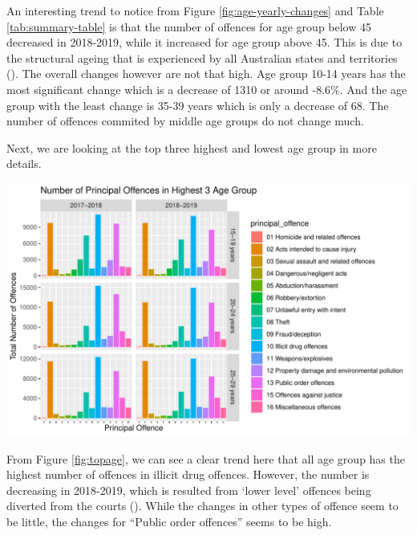 \documentclass[11pt,a4paper,]{article}
\let\origfigure\figure
\let\endorigfigure\endfigure
\renewenvironment{figure}[1][2] {
\expandafter\origfigure\expandafter[H]
} {
\endorigfigure
}
\begin{document}
An interesting trend to notice from Figure \ref{fig:age-yearly-changes} and Table \ref{tab:summary-table} is that the number of offences for age group below 45 decreased in 2018-2019, while it increased for age group above 45. This is due to the structural ageing that is experienced by all Australian states and territories (\textcite{AIC}). The overall changes however are not that high. Age group 10-14 years has the most significant change which is a decrease of 1310 or around -8.6\%. And the age group with the least change is 35-39 years which is only a decrease of 68. The number of offences commited by middle age groups do not change much.

Next, we are looking at the top three highest and lowest age group in more details.

\begin{figure}
\centering
\includegraphics{ETC5513-Assignment4_files/figure-latex/topage-1.pdf}
\caption{\label{fig:topage}Top three highest age group principal offences}
\end{figure}

From Figure \ref{fig:topage}, we can see a clear trend here that all age group has the highest number of offences in illicit drug offences. However, the number is decreasing in 2018-2019, which is resulted from `lower level' offences being diverted from the courts (\textcite{AIHW}). While the changes in other types of offence seem to be little, the changes for ``Public order offences'' seems to be high.
\end{document}
